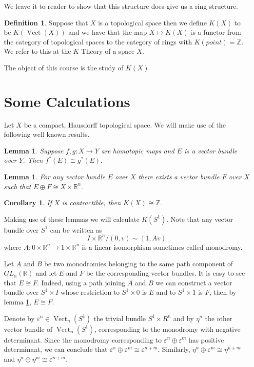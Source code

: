 \documentclass[a4paper,10pt]{article}
\theoremstyle{plain}%
\newtheorem{lem}[thm]{Lemma}
\newtheorem{cor}{Corollary}
\theoremstyle{definition}
\newtheorem{defn}{Definition}
\theoremstyle{remark}
\newcommand{\ZZ}{\mathbb{Z}}
\newcommand{\RR}{\mathbb{R}}
\DeclareMathOperator{\Vect}{Vect}
\renewcommand{\epsilon}{\varepsilon}
\begin{document}
We leave it to reader to show that this structure does give us a ring structure.

\begin{defn}
 Suppose that $X$ is a topological space then we define $K(X)$ to be $K(\Vect(X))$ and we have that the map $X\mapsto K(X)$
is a functor from the category of topological spaces to the category of rings with $K(point)=\ZZ$. We refer to this at the $K$-Theory of a space $X$.
\end{defn}

The object of this course is the study of $K(X)$.

\section{Some Calculations}

Let $X$ be a compact, Hausdorff topological space. We will make use of the following well known results.

\begin{lem}\label{htpyiso}
Suppose $f,g:X\to Y$ are homotopic maps and $E$ is a vector bundle over $Y$. Then $f^*(E)\cong g^* (E).$
\end{lem}

\begin{lem}
For any vector bundle $E$ over $X$ there exists a vector bundle $F$ over $X$ such that $E\oplus F\cong X \times \RR^n.$ 
\end{lem}

\begin{cor}
If $X$ is contractible, then $K(X)\cong \ZZ.$
\end{cor}

Making use of these lemmas we will calculate $K(S^1).$ Note that any vector bundle over $S^1$ can be written as
\[
I \times \RR^n\big/ (0,v) \sim (1,Av)
\]
where $A:0\times \RR^n \to 1\times \RR^n$ is a linear isomorphism sometimes called monodromy.

Let $A$ and $B$ be two monodromies belonging to the same path component of $GL_n(\RR)$ and let $E$ and $F$ be the corresponding vector bundles.  It is easy to see that $E\cong F$. Indeed, using a path joining $A$ and $B$ we can construct a vector bundle over $S^1\times I$ whose restriction to $S^1\times 0$ is $E$ and to $S^1\times 1$ is $F$, then by lemma \ref{htpyiso}, $E\cong F$.

Denote by $\epsilon^n\in \Vect_n(S^1)$ the trivial bundle $S^1\times R^n$ and by $\eta^n$ the other vector bundle of $\Vect_n(S^1)$, corresponding to the monodromy with negative determinant. Since the monodromy corresponding to $\epsilon^n\oplus\epsilon^m$ has positive determinant, we can conclude that $\epsilon^n\oplus\epsilon^m\cong \epsilon^{n+m}.$ Similarly, $\eta^n\oplus\epsilon^m\cong \eta^{n+m}$ and $\eta^n\oplus\eta^m\cong \epsilon^{n+m}.$
\end{document}
